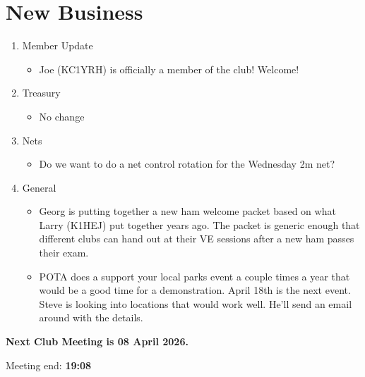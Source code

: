 \documentclass[12pt, letterpaper]{article}
\begin{document}
\section{New Business}
    \begin{enumerate}
    \item Member Update
        \begin{itemize}
            \item  Joe (KC1YRH) is officially a member of the club! Welcome!
        \end{itemize}
    \item Treasury
        \begin{itemize}
            \item No change
        \end{itemize}
    \item Nets
        \begin{itemize}
            \item Do we want to do a net control rotation for the Wednesday 2m net?
        \end{itemize}
    \item General
        \begin{itemize}
            \item Georg is putting together a new ham welcome packet based on what Larry (K1HEJ) put together years ago. The packet is generic enough that different clubs can hand out at their VE sessions after a new ham passes their exam.
            \item POTA does a support your local parks event a couple times a year that would be a good time for a demonstration. April 18th is the next event. Steve is looking into locations that would work well. He'll send an email around with the details.
        \end{itemize}
    \end{enumerate}

    \textbf{\Large{Next Club Meeting is 08 April 2026.}}

    Meeting end: \textbf{19:08}
\end{document}
